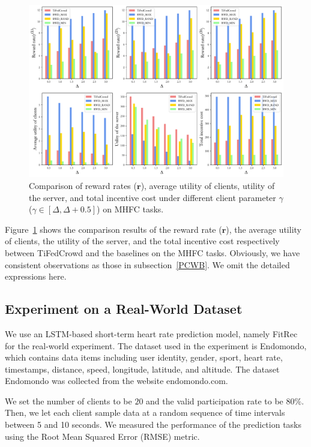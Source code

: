 \documentclass[final,1p,times]{elsarticle}
\begin{document}
\begin{figure}
	\centering
	\centerline{\includegraphics[width=5.5in]{fig5.pdf}}
	\caption{Comparison of reward rates ($\bm{r}$), average utility of clients, utility of the server, and total incentive cost under different client parameter $\gamma$ ($\gamma\in[\Delta,\Delta+0.5]$) on MHFC tasks.}
	\label{fig:5}
\end{figure}

Figure~\ref{fig:5} shows the comparison results of the reward rate ($\bm{r}$), the average utility of clients, the utility of the server, and the total incentive cost respectively between TiFedCrowd and the baselines on the MHFC tasks. Obviously, we have consistent observations as those in subsection~\ref{PCWB}. We omit the detailed expressions here.

\subsection{Experiment on a Real-World Dataset} \label{ERCP}
We use an LSTM-based short-term heart rate prediction model, namely FitRec \citep{ni2019modeling} for the real-world experiment. The dataset used in the experiment is  Endomondo, which contains data items including user identity, gender, sport, heart rate, timestamps, distance, speed, longitude, latitude, and altitude. The dataset Endomondo was collected from the website endomondo.com. 

We set the number of clients to be $20$ and the valid participation rate to be $80\%$. Then, we let each client sample data at a random sequence of time intervals between 5 and 10 seconds. We measured the performance of the prediction tasks using the Root Mean Squared Error (RMSE) metric.
\end{document}
